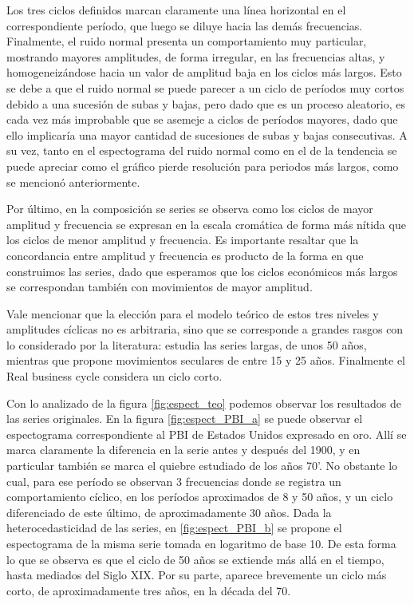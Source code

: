 \documentclass[a4paper]{article}
\begin{document}
Los tres ciclos definidos marcan claramente una línea horizontal en el correspondiente período, que luego se diluye hacia las demás frecuencias. Finalmente, el ruido normal presenta un comportamiento muy particular, mostrando mayores amplitudes, de forma irregular, en las frecuencias altas, y homogeneizándose hacia un valor de amplitud baja en los ciclos más largos. Esto se debe a que el ruido normal se puede parecer a un ciclo de períodos muy cortos debido a una sucesión de subas y bajas, pero dado que es un proceso aleatorio, es cada vez más improbable que se asemeje a ciclos de períodos mayores, dado que ello implicaría una mayor cantidad de sucesiones de subas y bajas consecutivas. A su vez, tanto en el espectograma del ruido normal como en el de la tendencia se puede apreciar como el gráfico pierde resolución para periodos más largos, como se mencionó anteriormente. 

Por último, en la composición se series se observa como los ciclos de mayor amplitud y frecuencia se expresan en la escala cromática de forma más nítida que los ciclos de menor amplitud y frecuencia. Es importante resaltar que la concordancia entre amplitud y frecuencia es producto de la forma en que construimos las series, dado que esperamos que los ciclos económicos más largos se correspondan también con movimientos de mayor amplitud.

Vale mencionar que la elección para el modelo teórico de estos tres niveles y amplitudes cíclicas no es arbitraria, sino que se corresponde a grandes rasgos con lo considerado por la literatura: \cite{kondratieff1979long} estudia las series largas, de unos 50 años, mientras que \cite{kuznets1930secular} propone movimientos seculares de entre 15 y 25 años. Finalmente el Real business cycle \citep{kydland1982time} considera un ciclo corto.



Con lo analizado de la figura \ref{fig:espect_teo} podemos observar los resultados de las series originales. En la figura \ref{fig:espect_PBI_a} se puede observar el espectograma correspondiente al PBI de Estados Unidos expresado en oro. Allí se marca claramente la diferencia en la serie antes y después del 1900, y en particular también se marca el quiebre estudiado de los años 70'. No obstante lo cual, para ese período se observan 3 frecuencias donde se registra un comportamiento cíclico, en los períodos aproximados de 8 y 50 años, y un ciclo diferenciado de este último, de aproximadamente 30 años. Dada la heterocedasticidad de las series, en \ref{fig:espect_PBI_b} se propone el espectograma de la misma serie tomada en logaritmo de base 10. De esta forma lo que se observa es que el ciclo de 50 años se extiende más allá en el tiempo, hasta mediados del Siglo XIX. Por su parte, aparece brevemente un ciclo más corto, de aproximadamente tres años, en la década del 70.
\end{document}
